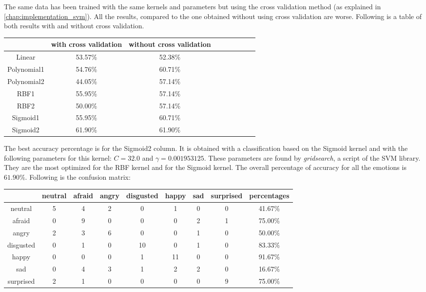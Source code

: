 \noindent The same data has been trained with the same kernels and parameters but using the cross validation method (as explained in \ref{chap:implementation_svm}). All the results, compared to the one obtained without using cross validation are worse. Following is a table of both results with and without cross validation.
\newline

\begin{tabular}{|c|c|c|c|c|c|c|c|c|}
  \hline
    & with cross validation & without cross validation \\
  \hline
  Linear & 53.57\% & 52.38\% \\
  Polynomial1 & 54.76\% & 60.71\% \\
  Polynomial2 & 44.05\% & 57.14\% \\
  RBF1 & 55.95\% & 57.14\% \\
  RBF2 & 50.00\% & 57.14\% \\
  Sigmoid1 & 55.95\% & 60.71\% \\
  Sigmoid2 & 61.90\% & 61.90\% \\
  \hline
\end{tabular}

\vspace{\baselineskip}
\noindent The best accuracy percentage is for the Sigmoid2 column. It is obtained with a classification based on the Sigmoid kernel and with the following parameters for this kernel: $ C = 32.0 $ and $ \gamma = 0.001953125 $. These parameters are found by \textit{gridsearch}, a script of the SVM library. They are the most optimized for the RBF kernel and for the Sigmoid kernel. The overall percentage of accuracy for all the emotions is $ 61.90\% $. Following is the confusion matrix:
\newline

\begin{tabular}{|c|c|c|c|c|c|c|c|c|}
  \hline
   & neutral & afraid & angry & disgusted & happy & sad & surprised & percentages \\
  \hline
  neutral & 5 & 4 & 2 & 0 & 1 & 0 & 0 & 41.67\% \\
  afraid & 0 & 9 & 0 & 0 & 0 & 2 & 1 & 75.00\% \\
  angry & 2 & 3 & 6 & 0 & 0 & 1 & 0 & 50.00\% \\
  disgusted & 0 & 1 & 0 & 10 & 0 & 1 & 0 & 83.33\% \\
  happy & 0 & 0 & 0 & 1 & 11 & 0 & 0 & 91.67\% \\
  sad & 0 & 4 & 3 & 1 & 2 & 2 & 0 & 16.67\% \\
  surprised & 2 & 1 & 0 & 0 & 0 & 0 & 9 & 75.00\%\\
  \hline
\end{tabular}
